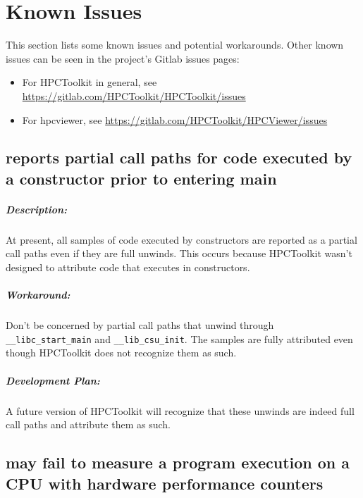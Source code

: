 \documentclass[11pt,twoside,letterpaper]{report}
\begin{document}

\cleardoublepage
\chapter{Known Issues}
\label{chpt:known}

This section lists some known issues and potential workarounds.
Other known issues can be seen in the project's Gitlab issues pages:
\begin{itemize}
 \item For HPCToolkit in general, see  \url{https://gitlab.com/HPCToolkit/HPCToolkit/issues}
 \item For hpcviewer, see \url{https://gitlab.com/HPCToolkit/HPCViewer/issues}
\end{itemize}

\section{\hpcrun{} reports partial call paths for code executed by a constructor prior to entering main}

\paragraph{Description:} At present, all samples of code executed by constructors are reported as a partial call paths even if they are full unwinds. This occurs because HPCToolkit wasn't designed to attribute code that executes in constructors.

\paragraph{Workaround:} Don't be concerned by partial call paths that unwind through \verb|__libc_start_main|  and \verb|__lib_csu_init|. The samples are fully attributed even though HPCToolkit does not recognize them as such.

\paragraph{Development Plan:} A future version of HPCToolkit will recognize that these unwinds are indeed full call paths and attribute them as such.

\section{\hpcrun{} may fail to measure a program execution on a CPU with hardware performance counters}
\end{document}
